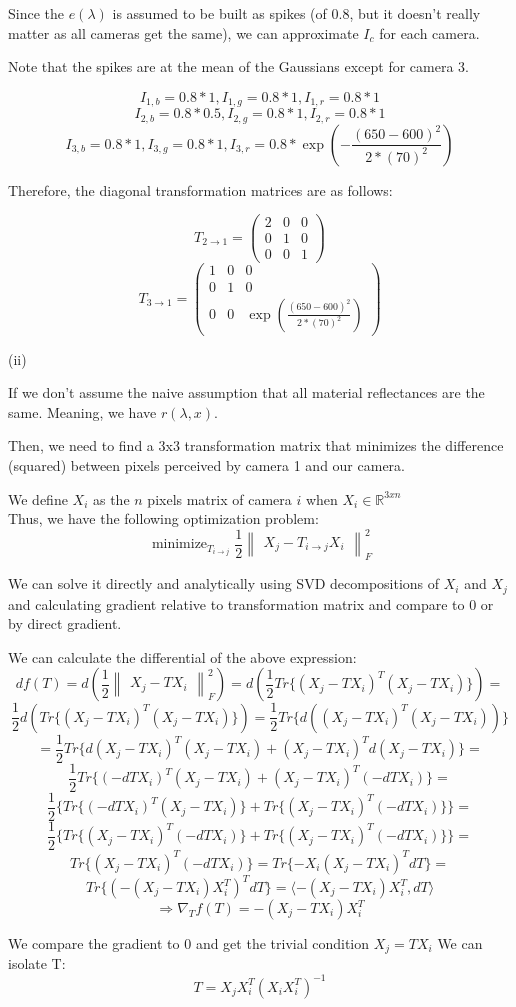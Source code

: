 \documentclass{homework}
\DeclareMathOperator*{\minimize}{minimize}
\begin{document}
Since the $e(\lambda)$ is assumed to be built as spikes (of 0.8, but it doesn't really matter as all cameras get the same), we can approximate $I_c$ for each camera.

Note that the spikes are at the mean of the Gaussians except for camera 3.

$$I_{1,b}=0.8*1, I_{1,g}=0.8*1, I_{1,r}=0.8*1$$
$$I_{2,b}=0.8*0.5, I_{2,g}=0.8*1, I_{2,r}=0.8*1$$
$$I_{3,b}=0.8*1, I_{3,g}=0.8*1, I_{3,r}=0.8*\exp{(-\frac{(650-600)^2}{2*(70)^2})}$$

Therefore, the diagonal transformation matrices are as follows:

$$T_{2\rightarrow1}= \begin{pmatrix} 
    2 & 0 & 0 \\ 
    0 & 1 & 0 \\ 
    0 & 0 & 1 
\end{pmatrix}$$
$$T_{3\rightarrow1}= \begin{pmatrix} 
    1 & 0 & 0 \\ 
    0 & 1 & 0 \\ 
    0 & 0 & \exp{(\frac{(650-600)^2}{2*(70)^2})} 
\end{pmatrix}$$

(ii)

If we don't assume the naive assumption that all material reflectances are the same. Meaning, we have $r(\lambda,x)$.

Then, we need to find a 3x3 transformation matrix that minimizes the difference (squared) between pixels perceived by camera 1 and our camera.

We define $X_i$ as the $n$ pixels matrix of camera $i$ when $X_i\in \mathbb{R}^{3xn}$\\
Thus, we have the following optimization problem:
$$
\minimize_{T_{i\rightarrow j}}
\frac{1}{2}{\begin{Vmatrix}X_j-T_{i\rightarrow j}X_i\end{Vmatrix}}_F^2$$

We can solve it directly and analytically using SVD decompositions of $X_i$ and $X_j$ and calculating gradient relative to transformation matrix and compare to 0 or by direct gradient.

We can calculate the differential of the above expression:
$$df(T)=d(\frac{1}{2}{\begin{Vmatrix}X_j-TX_i\end{Vmatrix}}_F^2)=d(\frac{1}{2}Tr\{(X_j-TX_i)^T(X_j-TX_i)\})=$$
$$\frac{1}{2}d(Tr\{(X_j-TX_i)^T(X_j-TX_i)\})=\frac{1}{2}Tr\{d((X_j-TX_i)^T(X_j-TX_i))\}$$
$$=\frac{1}{2}Tr\{d(X_j-TX_i)^T(X_j-TX_i) + (X_j-TX_i)^Td(X_j-TX_i)\}=$$
$$\frac{1}{2}Tr\{(-dTX_i)^T(X_j-TX_i) + (X_j-TX_i)^T(-dTX_i)\}=$$
$$\frac{1}{2}\{Tr\{(-dTX_i)^T(X_j-TX_i)\} + Tr\{ (X_j-TX_i)^T(-dTX_i)\}\}=$$
$$\frac{1}{2}\{Tr\{(X_j-TX_i)^T(-dTX_i)\} + Tr\{ (X_j-TX_i)^T(-dTX_i)\}\}= $$
$$Tr\{(X_j-TX_i)^T(-dTX_i)\}= Tr\{-X_i(X_j-TX_i)^TdT\}= $$
$$Tr\{(-(X_j-TX_i)X_i^T)^TdT\}= \langle -(X_j-TX_i)X_i^T,dT \rangle $$
$$\Rightarrow \nabla_{T}f(T) = -(X_j-TX_i)X_i^T $$

We compare the gradient to 0 and get the trivial condition $X_j=TX_i$
We can isolate T:
$$T=X_jX_i^T(X_iX_i^T)^{-1}$$
\end{document}
